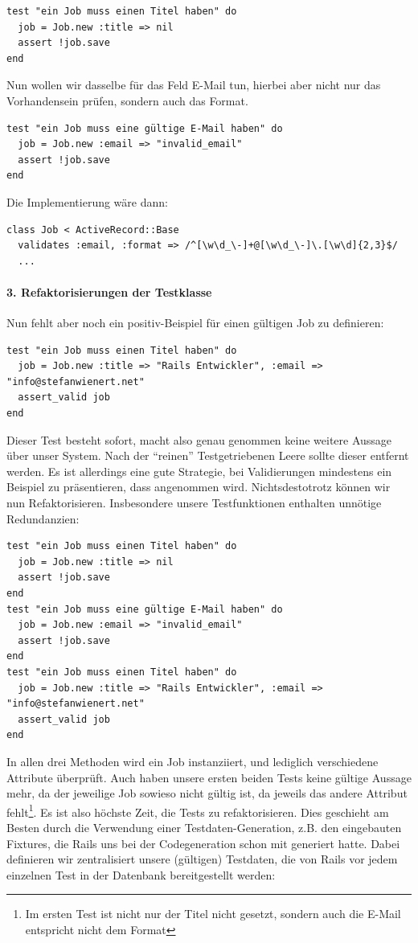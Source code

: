 \begin{lstlisting}
test "ein Job muss einen Titel haben" do
  job = Job.new :title => nil
  assert !job.save
end
\end{lstlisting}



Nun wollen wir dasselbe für das Feld E-Mail tun, hierbei aber nicht nur das Vorhandensein prüfen, sondern auch das Format.

\begin{lstlisting}
test "ein Job muss eine gültige E-Mail haben" do
  job = Job.new :email => "invalid_email"
  assert !job.save
end
\end{lstlisting}
Die Implementierung wäre dann:
\begin{lstlisting}
class Job < ActiveRecord::Base
  validates :email, :format => /^[\w\d_\-]+@[\w\d_\-]\.[\w\d]{2,3}$/
  ...
\end{lstlisting}

\paragraph{3. Refaktorisierungen der Testklasse}

Nun fehlt aber noch ein positiv-Beispiel für einen gültigen Job zu definieren:

\begin{lstlisting}
test "ein Job muss einen Titel haben" do
  job = Job.new :title => "Rails Entwickler", :email => "info@stefanwienert.net"
  assert_valid job
end
\end{lstlisting}
Dieser Test besteht sofort, macht also genau genommen keine weitere Aussage über unser System. Nach der "`reinen"' Testgetriebenen Leere sollte dieser entfernt werden. Es ist allerdings eine gute Strategie, bei Validierungen mindestens ein Beispiel zu präsentieren, dass angenommen wird. Nichtsdestotrotz können wir nun Refaktorisieren. Insbesondere unsere Testfunktionen enthalten unnötige Redundanzien:

\begin{lstlisting}
test "ein Job muss einen Titel haben" do
  job = Job.new :title => nil
  assert !job.save
end
test "ein Job muss eine gültige E-Mail haben" do
  job = Job.new :email => "invalid_email"
  assert !job.save
end
test "ein Job muss einen Titel haben" do
  job = Job.new :title => "Rails Entwickler", :email => "info@stefanwienert.net"
  assert_valid job
end
\end{lstlisting}
In allen drei Methoden wird ein Job instanziiert, und lediglich verschiedene Attribute überprüft. Auch haben unsere ersten beiden Tests keine gültige Aussage mehr, da der jeweilige Job sowieso nicht gültig ist, da jeweils das andere Attribut fehlt\footnote{Im ersten Test ist nicht nur der Titel nicht gesetzt, sondern auch die E-Mail entspricht nicht dem Format}. Es ist also höchste Zeit, die Tests zu refaktorisieren. Dies geschieht am Besten durch die Verwendung einer Testdaten-Generation, z.B. den eingebauten Fixtures, die Rails uns bei der Codegeneration schon mit generiert hatte. Dabei definieren wir zentralisiert unsere (gültigen) Testdaten, die von Rails vor jedem einzelnen Test in der Datenbank bereitgestellt werden:

